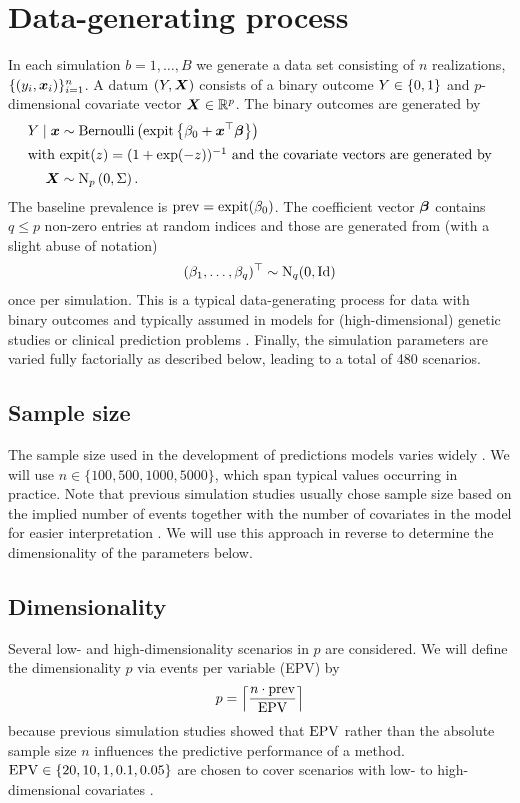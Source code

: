 \documentclass[a4paper, 11pt]{article}\usepackage[]{graphicx}\usepackage[]{color}
\begin{document}
\section{Data-generating process} \label{sec:dgp}

In each simulation $b = 1, \dots, B$ we generate a data set consisting of $n$
realizations, \ie $\{(y_i, \text{\boldmath$x$}_i)\}_{i=1}^n$. A datum $(Y, \text{\boldmath$X$})$ consists of
a binary outcome $Y \in \{0, 1\}$ and $p$-dimensional covariate vector
$\text{\boldmath$X$} \in \mathbb{R}^p$. The binary outcomes are generated by
\begin{align*}
  Y \mid \text{\boldmath$x$} &\sim \operatorname{Bernoulli}\left(\operatorname{expit}\left\{\beta_0 + \text{\boldmath$x$}^\top\text{\boldmath$\beta$}\right\}\right) \\
  \intertext{with $\operatorname{expit}(z) = (1 + \exp(-z))^{-1}$ and the covariate vectors are generated by}
  \text{\boldmath$X$} &\sim \operatorname{N}_p\left(0, \Sigma\right).
\end{align*}
The baseline prevalence is $\operatorname{prev} = \operatorname{expit}(\beta_0)$. The coefficient vector
$\text{\boldmath$\beta$}$ contains $q \leq p$ non-zero entries at random indices and those
are generated from (with a slight abuse of notation)
\begin{align*}
  (\beta_1, \dots, \beta_q)^\top \sim \operatorname{N}_q(0, \operatorname{Id})
\end{align*}
once per simulation. This is a typical data-generating process for data with
binary outcomes and typically assumed in models for (high-dimensional) genetic
studies \citep{zhu2004} or clinical prediction problems
\citep{steyerberg2019clinical}. Finally, the simulation parameters are varied
fully factorially as described below, leading to a total of 480
scenarios.

\subsection*{Sample size}
The sample size used in the development of predictions models varies widely
\citep{Damen2016}. We will use $n \in \{100, 500, 1000, 5000\}$, which span typical values
occurring in practice. Note that previous simulation studies usually chose sample
size based on the implied number of events together with the number of covariates
in the model for easier interpretation \citep{vanSmeden2018, Riley2018}. We will use this approach in
reverse to determine the dimensionality of the parameters below.

\subsection*{Dimensionality}
Several low- and high-dimensionality scenarios in $p$ are considered. We will
define the dimensionality $p$ via events per variable
(EPV) by $$p = \left\lceil\frac{n \cdot \operatorname{prev}}{\operatorname{EPV}}\right\rceil$$
because previous simulation studies showed that $\operatorname{EPV}$ rather than the absolute
sample size $n$ influences
the predictive performance of a method. $\operatorname{EPV} \in \{20, 10, 1, 0.1, 0.05\}$
are chosen to cover scenarios with low- to high-dimensional covariates
\citep[\cf][]{vanSmeden2018}.
\end{document}
